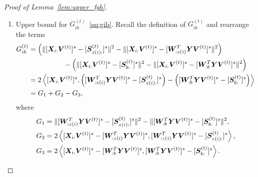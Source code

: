 \documentclass[lettersize,journal]{IEEEtran}
\theoremstyle{definition}
\theoremstyle{definition}
\newcommand{\of}[1]{\left(#1\right)}
\newcommand{\ang}[1]{\left\langle#1\right\rangle}
\begin{document}
\begin{proof}[Proof of Lemma~\ref{lem:upper_fgh}]
\begin{enumerate}
    Also note that 
    \begin{align}
        \onormSize{}{  [  \tilde \mS_{z(i):} ]^s - [  \tilde \mS_{b:} ]^s  }^2 &=  \onormSize{}{  [  \tilde \mS_{z(i):} ]^s -[ \mS_{z(i):} ]^s +  [ \mS_{z(i):} ]^s - [ \mS_{b:} ]^s + [ \mS_{b:} ]^s -[  \tilde \mS_{b:} ]^s  }^2 \\
        & \lesssim \onormSize{}{ [ \mS_{z(i):} ]^s - [ \mS_{b:} ]^s }^2 + \max_{a \in [r]} \onormSize{}{ [ \mS_{a:} ]^s -[  \tilde \mS_{a:} ]^s }^2 \\
        & \lesssim \onormSize{}{ [ \mS_{z(i):} ]^s - [ \mS_{b:} ]^s }^2  + \max_{a \in [r]} \frac{1}{\onormSize{}{\mS_{a:} }^2} \onormSize{}{ \mW_{:a}^T \mE \mV}^2\\
        & \lesssim \onormSize{}{ [ \mS_{z(i):} ]^s - [ \mS_{b:} ]^s }^2,
    \end{align}
    where the second inequality follows by Lemma~\ref{lem:norm_diff}, and the last inequality follows by the assumptions on $\onormSize{}{\mS_{a:}}$ in the parameter space~\eqref{eq:family}, the inequality~\eqref{eq:cond1} Condition~\ref{cond:origin} and the assumption $\Delta_{\min}^2 \gtrsim p^{-K/2}\log p$. 
    
    Therefore, we finish the proof of inequality~\eqref{eq:fib}.
    
    \item Upper bound for $G_{ib}^{(t)}$~\eqref{eq:gib}. Recall the definition of $G_{ib}^{(t)}$ and rearrange the terms
    \begin{align}
        G_{ib}^{(t)} &=   \of{ \onormSize{}{ [\mX_{i:} \mV^{(t)}]^s -  [  \mS_{z(i):}^{(t)}  ]^s}^2 -  \onormSize{}{ [\mX_{i:} \mV^{(t)}]^s -  [  \mW_{:z(i)}^T \mY \mV^{(t)} ]^s}^2}   \\
        & \quad \quad \quad \quad \quad -   \of{ \onormSize{}{ [\mX_{i:} \mV^{(t)}]^s -  [  \mS_{b:}^{(t)}  ]^s}^2 -  \onormSize{}{ [\mX_{i:} \mV^{(t)}]^s -  [  \mW_{:b}^T \mY \mV^{(t)} ]^s}^2 } \\
        &= 2 \ang{  [\mX_{i:} \mV^{(t)}]^s , \of{[  \mW_{:z(i)}^T \mY \mV^{(t)} ]^s -  [  \mS_{z(i):}^{(t)}  ]^s } - \of{ [  \mW_{:b}^T \mY \mV^{(t)} ]^s -  [  \mS_{b:}^{(t)}  ]^s }}\\
        &= G_1 + G_2 - G_3,
    \end{align}
    where 
    \begin{align}
        G_1 &= \onormSize{}{ [  \mW_{:z(i)}^T \mY \mV^{(t)} ]^s -  [  \mS_{z(i):}^{(t)}  ]^s}^2 - \onormSize{}{ [  \mW_{:b}^T \mY \mV^{(t)} ]^s -  [  \mS_{b:}^{(t)}  ]^s }^2,\\
        G_2 &= 2 \ang{ [\mX_{i:} \mV^{(t)}]^s  -  [  \mW_{:z(i)}^T \mY \mV^{(t)} ]^s,   [  \mW_{:z(i)}^T \mY \mV^{(t)} ]^s -  [  \mS_{z(i):}^{(t)}  ]^s},\\
        G_3 & = 2 \ang{ [\mX_{i:} \mV^{(t)}]^s  -  [  \mW_{:b}^T \mY \mV^{(t)} ]^s,  [  \mW_{:b}^T \mY \mV^{(t)} ]^s -  [  \mS_{b:}^{(t)}  ]^s}.
    \end{align}
    

\end{enumerate}
\end{proof}
\end{document}
